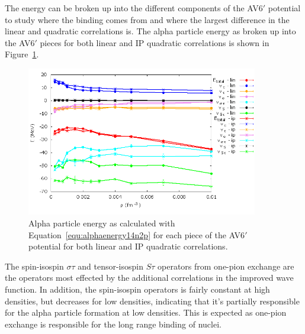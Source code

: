 The energy can be broken up into the different components of the AV6$'$ potential to study where the binding comes from and where the largest difference in the linear and quadratic correlations is. The alpha particle energy as broken up into the AV6$'$ pieces for both linear and IP quadratic correlations is shown in Figure~\ref{fig:av6_alpha}.
\begin{figure}[h!]
   \centering
   \includegraphics[width=0.9\textwidth]{figures/av6_alpha.png}
   \caption{Alpha particle energy as calculated with Equation~\ref{equ:alphaenergy14n2p} for each piece of the AV6$'$ potential for both linear and IP quadratic correlations.}
   \label{fig:av6_alpha}
\end{figure}
The spin-isospin $\sigma\tau$ and tensor-isospin $S\tau$ operators from one-pion exchange are the operators most effected by the additional correlations in the improved wave function. In addition, the spin-isospin operators is fairly constant at high densities, but decreases for low densities, indicating that it's partially responsible for the alpha particle formation at low densities. This is expected as one-pion exchange is responsible for the long range binding of nuclei.
